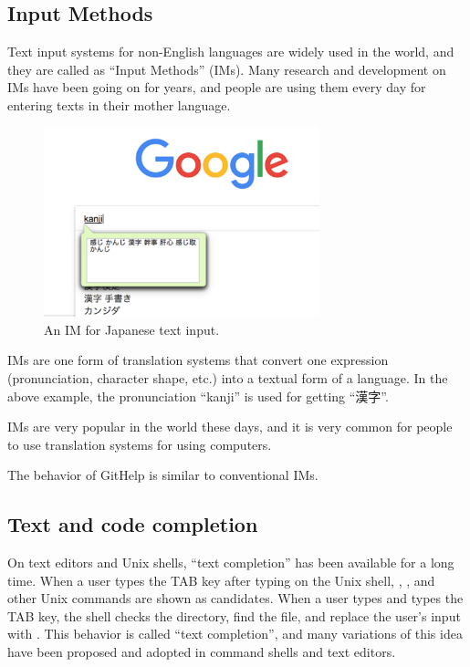 \documentclass{sigchi}
\def\GH{\textsf{GitHelp}}
\begin{document}
\subsection{Input Methods}

Text input systems for non-English languages are widely used
in the world,
and they are called as ``Input Methods'' (IMs).
%
Many research and development on IMs have been going on for years, and
people are using them every day for entering texts in their mother language.

\begin{figure}[h]
  \includegraphics[width=8cm,bb=0 0 976 670]{figures/nyuuryoku-ime.png}
  \caption{An IM for Japanese text input.}
  \label{bash1}
\end{figure}

IMs are one form of translation systems that convert one
expression (pronunciation, character shape, etc.)
into a textual form of a language.
In the above example, the pronunciation ``kanji''
is used for getting ``漢字''.

IMs are very popular in the world these days,
and it is very common for people to 
use translation systems for using computers.

The behavior of {\GH} is similar to conventional IMs.

\subsection{Text and code completion}

On text editors and Unix shells,
``text completion'' has been available for a long time.
%
When a user types the TAB key after typing  on the Unix shell,
, , and other Unix commands are shown as candidates.
When a user types  and types the TAB key,
the shell checks the directory, find the  file, and
replace the user's input with .
This behavior is called ``text completion'', and many variations of
this idea have been proposed and adopted in command shells and text editors.
\end{document}
